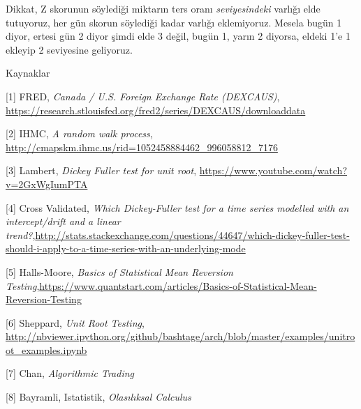 \documentclass[12pt,fleqn]{article}\usepackage{../../common}
\begin{document}
Dikkat, Z skorunun söylediği miktarın ters oranı {\em seviyesindeki} varlığı
elde tutuyoruz, her gün skorun söylediği kadar varlığı eklemiyoruz. Mesela bugün
1 diyor, ertesi gün 2 diyor şimdi elde 3 değil, bugün 1, yarın 2 diyorsa, eldeki
1'e 1 ekleyip 2 seviyesine geliyoruz. 

Kaynaklar
 
[1] FRED, {\em Canada / U.S. Foreign Exchange Rate (DEXCAUS)}, \url{https://research.stlouisfed.org/fred2/series/DEXCAUS/downloaddata}

[2] IHMC, {\em A random walk process}, \url{http://cmapskm.ihmc.us/rid=1052458884462_996058812_7176}

[3] Lambert, {\em Dickey Fuller test for unit root}, \url{https://www.youtube.com/watch?v=2GxWgIumPTA}

[4] Cross Validated, {\em Which Dickey-Fuller test for a time series modelled with an intercept/drift and a linear trend?},\url{http://stats.stackexchange.com/questions/44647/which-dickey-fuller-test-should-i-apply-to-a-time-series-with-an-underlying-mode}

[5] Halls-Moore, {\em Basics of Statistical Mean Reversion Testing},\url{https://www.quantstart.com/articles/Basics-of-Statistical-Mean-Reversion-Testing}

[6] Sheppard, {\em Unit Root Testing}, \url{http://nbviewer.ipython.org/github/bashtage/arch/blob/master/examples/unitroot_examples.ipynb}

[7] Chan, {\em Algorithmic Trading}

[8] Bayramli, Istatistik, {\em Olasılıksal Calculus}
\end{document}
